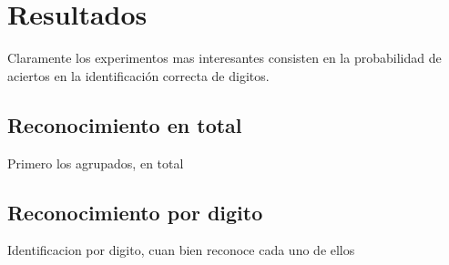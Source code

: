 \section{Resultados}

Claramente los experimentos mas interesantes consisten en la probabilidad
de aciertos en la identificaci\'on correcta de digitos.


\subsection{Reconocimiento en total}
Primero los agrupados, en total


\subsection{Reconocimiento por digito}
Identificacion por digito, cuan bien reconoce cada uno de ellos

